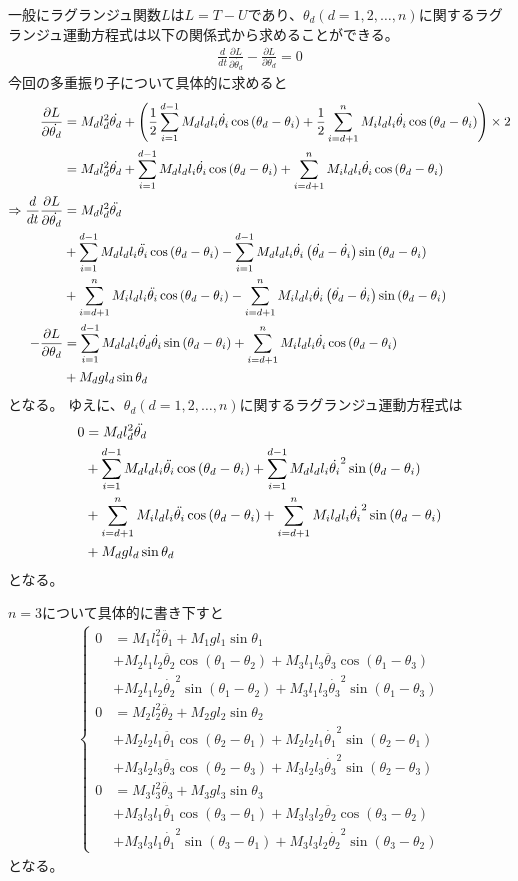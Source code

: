 \documentclass{jsarticle}
\newcommand{\eqa}[1]{\begin{align}#1\end{align}}
\newcommand{\so}{\Rightarrow}
\newcommand{\cost}[2]{\cos\left(\theta_{#1}-\theta_{#2}\right)}
\newcommand{\sint}[2]{\sin\left(\theta_{#1}-\theta_{#2}\right)}
\newcommand{\dott}[1]{\dot{\theta_{#1}}}
\newcommand{\ddott}[1]{\ddot{\theta_{#1}}}
\begin{document}
一般にラグランジュ関数$L$は$L = T - U$であり、$\theta_d(d=1,2,\dots,n)$に関するラグランジュ運動方程式は以下の関係式から求めることができる。
\eqa{
	\frac{d}{dt} \frac{\partial L}{\partial \dott{d}} - \frac{\partial L}{\partial \theta_d} = 0
}
今回の多重振り子について具体的に求めると
\eqa{
	\frac{\partial L}{\partial \dott{d}} &=
		M_d l_d^2 \dott{d}
		+ \left(\frac{1}{2}\sum_{i=1}^{d-1} M_d l_d l_i \dott{i} \cost{d}{i} + \frac{1}{2}\sum_{i=d+1}^n M_i l_d l_i \dott{i} \cost{d}{i} \right) \times 2 \notag\\
		&= M_d l_d^2 \dott{d} + \sum_{i=1}^{d-1} M_d l_d l_i \dott{i} \cost{d}{i} +\sum_{i=d+1}^n M_i l_d l_i \dott{i} \cost{d}{i} \\
	\so \frac{d}{dt} \frac{\partial L}{\partial \dott{d}} &=
		M_d l_d^2 \ddott{d} \notag\\
		&+ \sum_{i=1}^{d-1} M_d l_d l_i \ddott{i} \cost{d}{i}
			- \sum_{i=1}^{d-1} M_d l_d l_i \dott{i} \left( \dott{d} - \dott{i} \right) \sint{d}{i} \notag\\
		&+ \sum_{i=d+1}^n M_i l_d l_i \ddott{i} \cost{d}{i}
			- \sum_{i=d+1}^n M_i l_d l_i \dott{i} \left( \dott{d} - \dott{i} \right) \sint{d}{i} \notag\\
	- \frac{\partial L}{\partial \theta_d} &=
		\sum_{i=1}^{d-1} M_d l_d l_i \dott{d} \dott{i} \sint{d}{i} + \sum_{i=d+1}^n M_i l_d l_i \dott{i} \cost{d}{i} \notag\\
		&+ M_d g l_d \sin\theta_d
}
となる。
ゆえに、$\theta_d(d=1,2,\dots,n)$に関するラグランジュ運動方程式は
\eqa{
	0 &= M_d l_d^2 \ddott{d} \notag\\
		&+ \sum_{i=1}^{d-1} M_d l_d l_i \ddott{i} \cost{d}{i}
			+ \sum_{i=1}^{d-1} M_d l_d l_i \dott{i}^2 \sint{d}{i} \notag\\
		&+ \sum_{i=d+1}^n M_i l_d l_i \ddott{i} \cost{d}{i}
			+ \sum_{i=d+1}^n M_i l_d l_i \dott{i}^2 \sint{d}{i} \notag\\
		&+ M_d g l_d \sin\theta_d
}
となる。

$n=3$について具体的に書き下すと
\eqa{
	\begin{cases}
		0 &= M_1 l_1^2 \ddott{1} + M_1 g l_1 \sin\theta_1 \\
			&+ M_2 l_1 l_2 \ddott{2} \cost{1}{2} + M_3 l_1 l_3 \ddott{3} \cost{1}{3} \\
			&+ M_2 l_1 l_2 \dott{2}^2 \sint{1}{2} + M_3 l_1 l_3 \dott{3}^2 \sint{1}{3} \\
		0 &= M_2 l_2^2 \ddott{2}  + M_2 g l_2 \sin\theta_2 \\
			&+ M_2 l_2 l_1 \ddott{1} \cost{2}{1} + M_2 l_2 l_1 \dott{1}^2 \sint{2}{1} \\
			&+ M_3 l_2 l_3 \ddott{3} \cost{2}{3} + M_3 l_2 l_3 \dott{3}^2 \sint{2}{3} \\
		0 &= M_3 l_3^2 \ddott{3}  + M_3 g l_3 \sin\theta_3 \\
			&+ M_3 l_3 l_1 \ddott{1} \cost{3}{1} + M_3 l_3 l_2 \ddott{2} \cost{3}{2} \\
			&+ M_3 l_3 l_1 \dott{1}^2 \sint{3}{1} + M_3 l_3 l_2 \dott{2}^2 \sint{3}{2}
	\end{cases}
}
となる。
\end{document}
